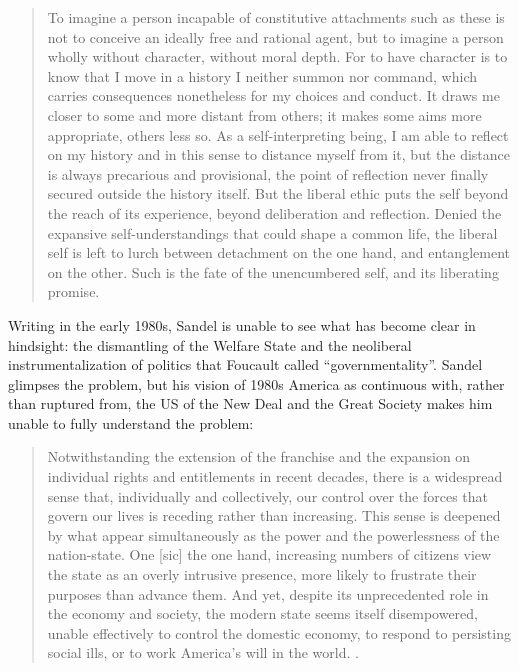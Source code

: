 \documentclass[12pt,oneside]{memoir}
\begin{document}
\begin{quote}

To imagine a person incapable of constitutive attachments such as these is not to conceive an ideally free and rational agent, but to imagine a person wholly without character, without moral depth. For to have character is to know that I move in a history I neither summon nor command, which carries consequences nonetheless for my choices and conduct. It draws me closer to some and more distant from others; it makes some aims more appropriate, others less so. As a self-interpreting being, I am able to reflect on my history and in this sense to distance myself from it, but the distance is always precarious and provisional, the point of reflection never finally secured outside the history itself. But the liberal ethic puts the self beyond the reach of its experience, beyond deliberation and reflection. Denied the expansive self-understandings that could shape a common life, the liberal self is left to lurch between detachment on the one hand, and entanglement on the other. Such is the fate of the unencumbered self, and its liberating promise. \citep[90-91]{Sandel1984}

\end{quote}

Writing in the early 1980s, Sandel is unable to see what has become clear in hindsight: the dismantling of the Welfare State and the neoliberal instrumentalization of politics that Foucault called ``governmentality''. Sandel glimpses the problem, but his vision of 1980s America as continuous with, rather than ruptured from, the US of the New Deal and the Great Society makes him unable to fully understand the problem: 

\begin{quote}

Notwithstanding the extension of the franchise and the expansion on individual rights and entitlements in recent decades, there is a widespread sense that, individually and collectively, our control over the forces that govern our lives is receding rather than increasing. This sense is deepened by what appear simultaneously as the power and the powerlessness of the nation-state. One [sic] the one hand, increasing numbers of citizens view the state as an overly intrusive presence, more likely to frustrate their purposes than advance them. And yet, despite its unprecedented role in the economy and society, the modern state seems itself disempowered, unable effectively to control the domestic economy, to respond to persisting social ills, or to work America's will in the world. \citep[92]{Sandel1984}.

\end{quote}
\end{document}
